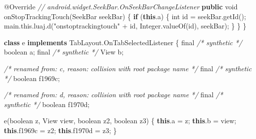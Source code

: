 \documentclass[
]{article}
\newenvironment{Shaded}{}{}
\newcommand{\AttributeTok}[1]{\textcolor[rgb]{0.49,0.56,0.16}{#1}}
\newcommand{\BuiltInTok}[1]{\textcolor[rgb]{0.00,0.50,0.00}{#1}}
\newcommand{\CommentTok}[1]{\textcolor[rgb]{0.38,0.63,0.69}{\textit{#1}}}
\newcommand{\ControlFlowTok}[1]{\textcolor[rgb]{0.00,0.44,0.13}{\textbf{#1}}}
\newcommand{\DataTypeTok}[1]{\textcolor[rgb]{0.56,0.13,0.00}{#1}}
\newcommand{\FunctionTok}[1]{\textcolor[rgb]{0.02,0.16,0.49}{#1}}
\newcommand{\KeywordTok}[1]{\textcolor[rgb]{0.00,0.44,0.13}{\textbf{#1}}}
\newcommand{\NormalTok}[1]{#1}
\newcommand{\OperatorTok}[1]{\textcolor[rgb]{0.40,0.40,0.40}{#1}}
\newcommand{\StringTok}[1]{\textcolor[rgb]{0.25,0.44,0.63}{#1}}
\begin{document}
\begin{Shaded}
\begin{Highlighting}[]
        \AttributeTok{@Override} \CommentTok{// android.widget.SeekBar.OnSeekBarChangeListener}
        \KeywordTok{public} \DataTypeTok{void} \FunctionTok{onStopTrackingTouch}\OperatorTok{(}\NormalTok{SeekBar seekBar}\OperatorTok{)} \OperatorTok{\{}
            \ControlFlowTok{if} \OperatorTok{(}\KeywordTok{this}\OperatorTok{.}\FunctionTok{a}\OperatorTok{)} \OperatorTok{\{}
                \DataTypeTok{int}\NormalTok{ id }\OperatorTok{=}\NormalTok{ seekBar}\OperatorTok{.}\FunctionTok{getId}\OperatorTok{();}
\NormalTok{                main}\OperatorTok{.}\FunctionTok{this}\OperatorTok{.}\FunctionTok{luaj}\OperatorTok{.}\FunctionTok{d}\OperatorTok{(}\StringTok{"onstoptrackingtouch"} \OperatorTok{+}\NormalTok{ id}\OperatorTok{,} \BuiltInTok{Integer}\OperatorTok{.}\FunctionTok{valueOf}\OperatorTok{(}\NormalTok{id}\OperatorTok{),}\NormalTok{ seekBar}\OperatorTok{);}
            \OperatorTok{\}}
        \OperatorTok{\}}
    \OperatorTok{\}}

    \KeywordTok{class}\NormalTok{ e }\KeywordTok{implements}\NormalTok{ TabLayout}\OperatorTok{.}\FunctionTok{OnTabSelectedListener} \OperatorTok{\{}
        \DataTypeTok{final} \CommentTok{/* synthetic */} \DataTypeTok{boolean}\NormalTok{ a}\OperatorTok{;}
        \DataTypeTok{final} \CommentTok{/* synthetic */} \BuiltInTok{View}\NormalTok{ b}\OperatorTok{;}

        \CommentTok{/* renamed from: c, reason: collision with root package name */}
        \DataTypeTok{final} \CommentTok{/* synthetic */} \DataTypeTok{boolean}\NormalTok{ f1969c}\OperatorTok{;}

        \CommentTok{/* renamed from: d, reason: collision with root package name */}
        \DataTypeTok{final} \CommentTok{/* synthetic */} \DataTypeTok{boolean}\NormalTok{ f1970d}\OperatorTok{;}

        \FunctionTok{e}\OperatorTok{(}\DataTypeTok{boolean}\NormalTok{ z}\OperatorTok{,} \BuiltInTok{View}\NormalTok{ view}\OperatorTok{,} \DataTypeTok{boolean}\NormalTok{ z2}\OperatorTok{,} \DataTypeTok{boolean}\NormalTok{ z3}\OperatorTok{)} \OperatorTok{\{}
            \KeywordTok{this}\OperatorTok{.}\FunctionTok{a} \OperatorTok{=}\NormalTok{ z}\OperatorTok{;}
            \KeywordTok{this}\OperatorTok{.}\FunctionTok{b} \OperatorTok{=}\NormalTok{ view}\OperatorTok{;}
            \KeywordTok{this}\OperatorTok{.}\FunctionTok{f1969c} \OperatorTok{=}\NormalTok{ z2}\OperatorTok{;}
            \KeywordTok{this}\OperatorTok{.}\FunctionTok{f1970d} \OperatorTok{=}\NormalTok{ z3}\OperatorTok{;}
        \OperatorTok{\}}


\end{Highlighting}
\end{Shaded}
\end{document}
